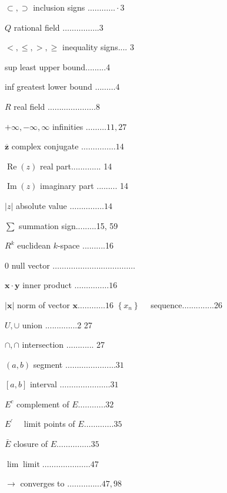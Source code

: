 \documentclass[10pt]{article}
\begin{document}
$\subset, \supset$ inclusion signs $\ldots \ldots \ldots \ldots \cdot 3$

$Q$ rational field $\ldots \ldots \ldots \ldots \ldots .3$

$<, \leq,>, \geq$ inequality signs.... 3

sup least upper bound.........4

inf greatest lower bound $\ldots \ldots \ldots 4$

$R$ real field $\ldots \ldots \ldots \ldots \ldots \ldots \ldots 8$

$+\infty,-\infty, \infty$ infinities $\ldots \ldots \ldots 11,27$

$\overline{\boldsymbol{z}}$ complex conjugate $\ldots \ldots \ldots \ldots \ldots 14$

$\operatorname{Re}(z)$ real part............. 14

$\operatorname{Im}(z)$ imaginary part ......... 14

$|z|$ absolute value $\ldots \ldots \ldots \ldots \ldots 14$

$\sum$ summation sign.........15, 59

$R^{k}$ euclidean $k$-space ..........16

0 null vector $\ldots \ldots \ldots \ldots \ldots \ldots \ldots \ldots \ldots \ldots \ldots \ldots$

$\mathbf{x} \cdot \mathbf{y}$ inner product $\ldots \ldots \ldots \ldots \ldots 16$

$|\mathbf{x}|$ norm of vector $\mathbf{x} \ldots \ldots \ldots \ldots 16$ $\left\{x_{n}\right\} \quad$ sequence..............26

$U, \cup$ union ..............2 27

$\cap, \cap$ intersection ............ 27

$(a, b)$ segment $\ldots \ldots \ldots \ldots \ldots \ldots . \ldots 31$

$[a, b]$ interval $\ldots \ldots \ldots \ldots \ldots \ldots . \ldots 31$

$E^{c}$ complement of $E \ldots \ldots \ldots \ldots 32$

$E^{\prime} \quad$ limit points of $E \ldots \ldots \ldots \ldots .35$

$\bar{E}$ closure of $E \ldots \ldots \ldots \ldots \ldots 35$

$\lim \operatorname{limit} \ldots \ldots \ldots \ldots \ldots \ldots \ldots 47$

$\rightarrow$ converges to $\ldots \ldots \ldots \ldots \ldots 47,98$
\end{document}
